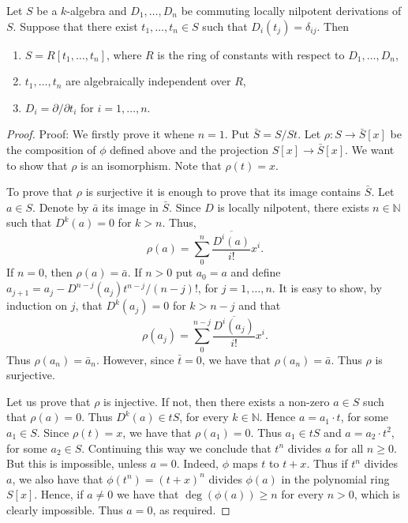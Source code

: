 \documentclass[12pt, oneside]{book}
\begin{document}
\begin{proposition}
    Let $S$ be a $k$-algebra and $D_1, \ldots, D_n$ be commuting locally nilpotent derivations of $S$. Suppose that there exist $t_1, \ldots, t_n \in S$ such that $D_i\left(t_j\right)=\delta_{i j}$.
    Then
    \begin{enumerate}
        \item
              $S=R\left[t_1, \ldots, t_n\right]$, where $R$ is the ring of constants with respect to $D_1, \ldots, D_n$,
        \item
              $t_1, \ldots, t_n$ are algebraically independent over $R$,
        \item
              $D_i=\partial / \partial t_i$ for $i=1, \ldots, n$.
    \end{enumerate}
    \begin{proof}
        Proof: We firstly prove it whene $n=1$.
        Put $\bar{S}=S / S t$. Let $\rho: S \longrightarrow \bar{S}[x]$ be the composition of $\phi$ defined above and the projection $S[x] \longrightarrow \bar{S}[x]$. We want to show that $\rho$ is an isomorphism. Note that $\rho(t)=x$.

        To prove that $\rho$ is surjective it is enough to prove that its image contains $\bar{S}$. Let $a \in S$. Denote by $\bar{a}$ its image in $\bar{S}$. Since $D$ is locally nilpotent, there exists $n \in \mathbb{N}$ such that $D^k(a)=0$ for $k>n$. Thus,
        \begin{equation*}
            \rho(a)=\sum_0^n \frac{\overline{D^i(a)}}{i!} x^i .
        \end{equation*}
        If $n=0$, then $\rho(a)=\bar{a}$. If $n>0$ put $a_0=a$ and define $a_{j+1}=a_j- D^{n-j}\left(a_j\right) t^{n-j} /(n-j)!$, for $j=1, \ldots, n$. It is easy to show, by induction on $j$, that $D^k\left(a_j\right)=0$ for $k>n-j$ and that
        \begin{equation*}
            \rho\left(a_j\right)=\sum_0^{n-j} \frac{\overline{D^i\left(a_j\right)}}{i!} x^i .
        \end{equation*}
        Thus $\rho\left(a_n\right)=\bar{a}_n$. However, since $\bar{t}=0$, we have that $\rho\left(a_n\right)=\bar{a}$. Thus $\rho$ is surjective.

        Let us prove that $\rho$ is injective. If not, then there exists a non-zero $a \in S$ such that $\rho(a)=0$. Thus $D^k(a) \in t S$, for every $k \in \mathbb{N}$. Hence $a=a_1 \cdot t$, for some $a_1 \in S$. Since $\rho(t)=x$, we have that $\rho\left(a_1\right)=0$. Thus $a_1 \in t S$ and $a=a_2 \cdot t^2$, for some $a_2 \in S$. Continuing this way we conclude that $t^n$ divides $a$ for all $n \geq 0$. But this is impossible, unless $a=0$. Indeed, $\phi$ maps $t$ to $t+x$. Thus if $t^n$ divides $a$, we also have that $\phi\left(t^n\right)=(t+x)^n$ divides $\phi(a)$ in the polynomial ring $S[x]$. Hence, if $a \neq 0$ we have that $\operatorname{deg}(\phi(a)) \geq n$ for every $n>0$, which is clearly impossible. Thus $a=0$, as required.


\end{proof}
\end{proposition}
\end{document}
